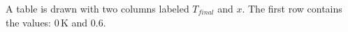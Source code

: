 A table is drawn with two columns labeled \( T_{final} \) and \( x \). The first row contains the values:  
\( 0 \, \text{K} \) and \( 0.6 \).